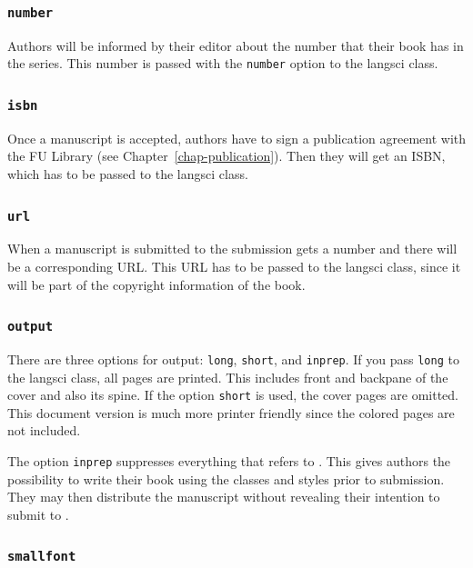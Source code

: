 \subsubsection{\texttt{number}}

Authors will be informed by their editor about the number that their book has in the series. This
number is passed with the \texttt{number} option to the langsci class.

\subsubsection{\texttt{isbn}}

Once a manuscript is accepted, authors have to sign a publication agreement with the FU Library (see
Chapter~\ref{chap-publication}). Then they will get an ISBN, which has to be passed to the langsci class.

\subsubsection{\texttt{url}}

When a manuscript is submitted to \lsp the submission gets a number and there will be a
corresponding URL. This URL has to be passed to the langsci class, since it will be part of the
copyright information of the book.

\subsubsection{\texttt{output}}

There are three options for output: \texttt{long}, \texttt{short}, and \texttt{inprep}. If you pass
\texttt{long} to the langsci class, all pages are printed. This includes front and backpane of the
cover and also its spine. If the option \texttt{short} is used, the cover pages are omitted. This
document version is much more printer friendly since the colored pages are not included.

The option \texttt{inprep} suppresses everything that refers to \lsp. This gives authors the
possibility to write their book using the \lsp classes and styles prior to submission. They may then
distribute the manuscript without revealing their intention to submit to \lsp.

\subsubsection{\texttt{smallfont}}

